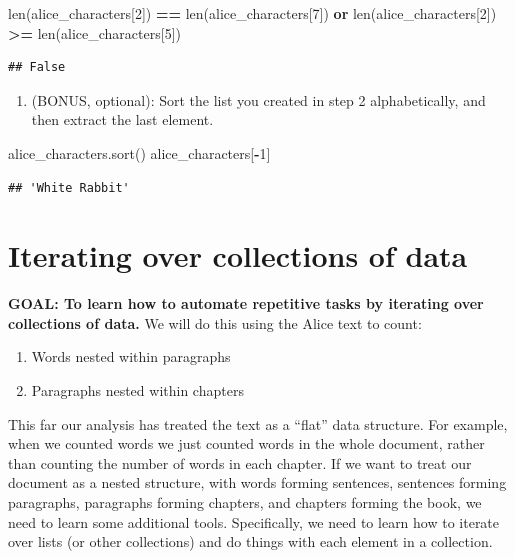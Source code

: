\documentclass[]{book}
\newenvironment{Shaded}{\begin{snugshade}}{\end{snugshade}}
\newcommand{\BuiltInTok}[1]{#1}
\newcommand{\DecValTok}[1]{\textcolor[rgb]{0.00,0.00,0.81}{#1}}
\newcommand{\KeywordTok}[1]{\textcolor[rgb]{0.13,0.29,0.53}{\textbf{#1}}}
\newcommand{\NormalTok}[1]{#1}
\newcommand{\OperatorTok}[1]{\textcolor[rgb]{0.81,0.36,0.00}{\textbf{#1}}}
\providecommand{\tightlist}{%
  \setlength{\itemsep}{0pt}\setlength{\parskip}{0pt}}
\begin{document}
\begin{Shaded}
\begin{Highlighting}[]
\BuiltInTok{len}\NormalTok{(alice_characters[}\DecValTok{2}\NormalTok{]) }\OperatorTok{==} \BuiltInTok{len}\NormalTok{(alice_characters[}\DecValTok{7}\NormalTok{]) }\KeywordTok{or} \BuiltInTok{len}\NormalTok{(alice_characters[}\DecValTok{2}\NormalTok{]) }\OperatorTok{>=} \BuiltInTok{len}\NormalTok{(alice_characters[}\DecValTok{5}\NormalTok{])}
\end{Highlighting}
\end{Shaded}

\begin{verbatim}
## False
\end{verbatim}

\begin{enumerate}
\def\labelenumi{\arabic{enumi}.}
\setcounter{enumi}{3}
\tightlist
\item
  (BONUS, optional): Sort the list you created in step 2 alphabetically,
  and then extract the last element.
\end{enumerate}

\begin{Shaded}
\begin{Highlighting}[]
\NormalTok{alice_characters.sort()}
\NormalTok{alice_characters[}\OperatorTok{-}\DecValTok{1}\NormalTok{]}
\end{Highlighting}
\end{Shaded}

\begin{verbatim}
## 'White Rabbit'
\end{verbatim}

\hypertarget{iterating-over-collections-of-data}{%
\section{Iterating over collections of data}\label{iterating-over-collections-of-data}}

\textbf{GOAL: To learn how to automate repetitive tasks by iterating over collections of data.} We will do this using the Alice text to count:

\begin{enumerate}
\def\labelenumi{\arabic{enumi}.}
\tightlist
\item
  Words nested within paragraphs
\item
  Paragraphs nested within chapters
\end{enumerate}

This far our analysis has treated the text as a ``flat'' data structure. For example, when we counted words we just counted words in the whole document, rather than counting the number of words in each chapter. If we want to treat our document as a nested structure, with words forming sentences, sentences forming paragraphs, paragraphs forming chapters, and chapters forming the book, we need to learn some additional tools. Specifically, we need to learn how to iterate over lists (or other collections) and do things with each element in a collection.
\end{document}
